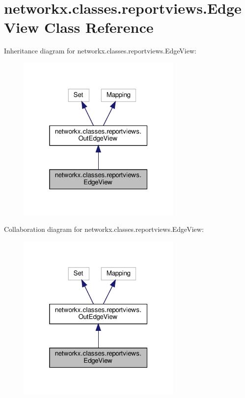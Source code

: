 \hypertarget{classnetworkx_1_1classes_1_1reportviews_1_1EdgeView}{}\section{networkx.\+classes.\+reportviews.\+Edge\+View Class Reference}
\label{classnetworkx_1_1classes_1_1reportviews_1_1EdgeView}


Inheritance diagram for networkx.\+classes.\+reportviews.\+Edge\+View\+:
\nopagebreak
\begin{figure}[H]
\begin{center}
\leavevmode
\includegraphics[width=229pt]{classnetworkx_1_1classes_1_1reportviews_1_1EdgeView__inherit__graph}
\end{center}
\end{figure}


Collaboration diagram for networkx.\+classes.\+reportviews.\+Edge\+View\+:
\nopagebreak
\begin{figure}[H]
\begin{center}
\leavevmode
\includegraphics[width=229pt]{classnetworkx_1_1classes_1_1reportviews_1_1EdgeView__coll__graph}
\end{center}
\end{figure}
